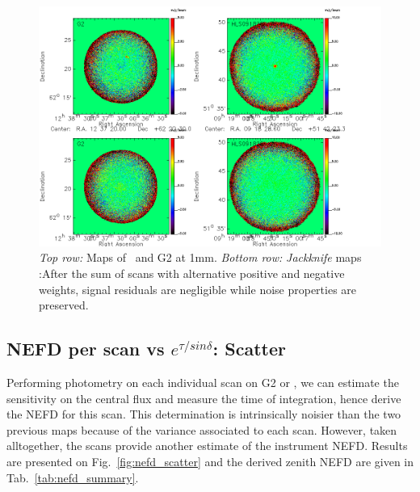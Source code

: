 \begin{figure}[hhh]
\begin{center}
\includegraphics[clip, angle=0, scale=0.5]{Figures/nefd_jackknife.png}
\caption[Jackknife maps of G2 and \hls]{\emph{Top row:} Maps of \hls\ and G2 at
  1mm. \emph{Bottom row:} \emph{Jackknife} maps :After the sum of scans with alternative positive and negative
  weights, signal residuals are negligible while noise properties are preserved.}
\label{fig:jk_maps}
\end{center}
\end{figure}


\subsection{NEFD per scan vs $e^{\tau/sin\delta}$: Scatter}

Performing photometry on each individual scan on G2 or \hls, we can estimate the
sensitivity on the central flux and measure the time of integration, hence
derive the NEFD for this scan. This determination is intrinsically noisier than
the two previous maps because of the variance associated to each scan. However,
taken alltogether, the scans provide another estimate of the instrument
NEFD. Results are presented on Fig.~\ref{fig:nefd_scatter} and the derived
zenith NEFD are given in Tab.~\ref{tab:nefd_summary}.

